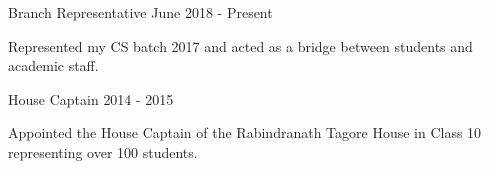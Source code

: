 

\begin{cventries}

  \projects
    {} %
    {Branch Representative} %
    {June 2018 - Present} %
    {} %
    {
      \begin{por} %
        \item []{Represented my CS batch 2017 and acted as a bridge between students and academic staff.}
      \end{por}
    }

\projects
    {} %
    {House Captain} %
    {2014 - 2015} %
    {} %
    {
      \begin{por} %
        \item []{Appointed the House Captain of the Rabindranath Tagore House in Class 10 representing over 100 students.}
      \end{por}
    }

\end{cventries}
